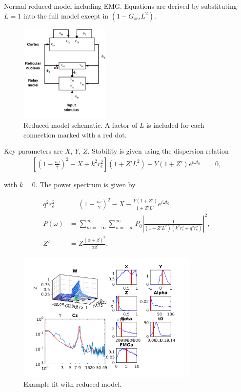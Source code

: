 \documentclass[10pt,a4paper]{article}
\begin{document}
Normal reduced model including EMG. Equations are derived by substituting $L = 1$ into the full model except in $(1-G_{srs}L^2)$. 

\begin{figure}[h!]
\begin{center}
\includegraphics[width=0.4\textwidth]{reduced}
\caption{Reduced model schematic. A factor of $L$ is included for each connection marked with a red dot.}
\label{fig:full}
\end{center}
\end{figure}

Key parameters are $X$, $Y$, $Z$. Stability is given using the dispersion relation
\begin{align}
	\left[ \left(1-\frac{i\omega}{\gamma}\right)^2 - X + k^2r_e^2 \right] \left( 1+Z' L^2 \right) - Y\left( 1+Z' \right) e^{i\omega t_0} &= 0, %
\end{align}

with $k=0$. The power spectrum is given by

\begin{align}
	q^2r_e^2 &= \left( 1 - \frac{i \omega}{\gamma}\right)^2  - X - \frac{Y(1+Z')}{1+Z'L^2}e^{i\omega t_0},\\[14pt]
	P(\omega) &= \sum_{m = -\infty}^{\infty}\sum_{n = -\infty}^{\infty} P_0 \left| \frac{1}{(1+Z'L^2)(k^2r_e^2+q^2r_e^2)}\right|^2,\\[14pt]
	Z' &= Z \frac{(\alpha+\beta)^2}{\alpha\beta},
\end{align}

\begin{figure}[h!]
\begin{center}
\includegraphics[width=0.8\textwidth]{example_reduced}
\caption{Example fit with reduced model. }
\label{fig:full}
\end{center}
\end{figure}
\end{document}
